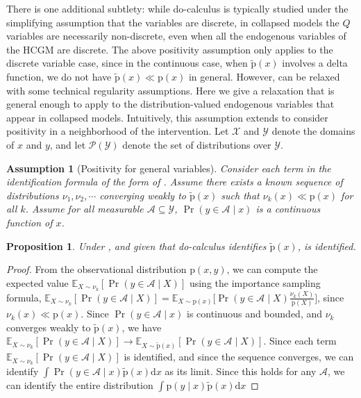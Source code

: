 \documentclass[12pt]{article}
\newtheorem{assumption}{Assumption}
\newtheorem{proposition}{Proposition}
\newcommand{\di}{\mathrm{d}}
\newcommand{\pr}{\mathrm{p}}
\begin{document}
There is one additional subtlety: while do-calculus is typically studied under the simplifying assumption that the variables are discrete, in collapsed models the $Q$ variables are necessarily non-discrete, even when all the endogenous variables of the HCGM are discrete.
The above positivity assumption only applies to the discrete variable case, since in the continuous case, when $\tilde{\pr}(x)$ involves a delta function, we do not have $\tilde{\pr}(x) \ll \pr(x)$ in general.
However,  can be relaxed with some technical regularity assumptions.
Here we give a relaxation that is general enough to apply to the distribution-valued endogenous variables that appear in collapsed models.
Intuitively, this assumption extends  to consider positivity in a neighborhood of the intervention.
Let $\mathcal{X}$ and $\mathcal{Y}$ denote the domains of $x$ and $y$, and let $\mathcal{P}(\mathcal{Y})$ denote the set of distributions over $\mathcal{Y}$.
\begin{assumption}[Positivity for general variables] \label{asm:positivity_general}
        Consider each term in the identification formula of the form of .
        Assume there exists a known sequence of distributions $\nu_1, \nu_2, \cdots$ converging weakly to $\tilde{\pr}(x)$ such that $\nu_k(x) \ll \pr(x)$ for all $k$.
        Assume for all measurable $\mathcal{A} \subseteq \mathcal{Y}$, $\Pr(y \in \mathcal{A} \mid x)$ is a continuous function of $x$.
\end{assumption}
\begin{proposition} \label{prop:positivity_general}
        Under , and given that do-calculus identifies $\tilde{\pr}(x)$,  is identified.
\end{proposition}
\begin{proof}
From the observational distribution $\pr(x, y)$, we can compute the expected value $\mathbb{E}_{X \sim \nu_k}[\Pr(y \in \mathcal{A} \mid X)]$ using the importance sampling formula,
$\mathbb{E}_{X \sim \nu_k}[\Pr(y \in \mathcal{A} \mid X)] = \mathbb{E}_{X \sim \pr(x)}\Big[\Pr(y \in \mathcal{A} \mid X)\frac{\nu_k(X)}{\pr(X)}\Big]$,
since $\nu_k(x) \ll \pr(x)$.
Since $\Pr(y \in \mathcal{A} \mid x)$ is continuous and bounded, and $\nu_k$ converges weakly to $\tilde{\pr}(x)$, we have
$\mathbb{E}_{X \sim \nu_k}[\Pr(y \in \mathcal{A} \mid X)] \to \mathbb{E}_{X \sim \tilde{\pr}(x)}[\Pr(y \in \mathcal{A} \mid X)]$.
Since each term $\mathbb{E}_{X \sim \nu_k}[\Pr(y \in \mathcal{A} \mid X)]$ is identified, and since the sequence converges, we can identify $\int \Pr(y \in \mathcal{A} \mid x) \tilde{\pr}(x) \di x$ as its limit. 
Since this holds for any $\mathcal{A}$, we can identify the entire distribution $\int \pr(y \mid x) \tilde{\pr}(x) \di x$
\end{proof}
\end{document}
